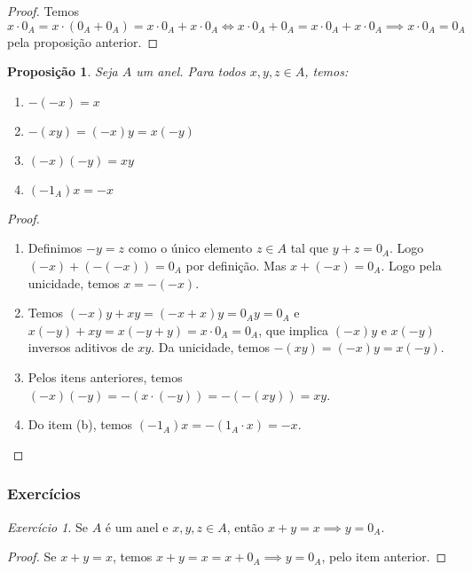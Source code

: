 \documentclass{article}
\newtheorem{prop}{Proposição}[section]
\theoremstyle{theorem}
\theoremstyle{lemma}
\theoremstyle{definition}
\theoremstyle{remark}
\newtheorem{exercicio}{Exercício}[subsection]
\begin{document}
\begin{proof}
	Temos $x\cdot 0_A = x\cdot (0_A + 0_A) = x\cdot 0_A +x\cdot 0_A \iff x\cdot 0_A + 0_A = x\cdot 0_A + x\cdot 0_A \implies x\cdot 0_A = 0_A $ pela proposição anterior.
\end{proof}
\begin{prop}
	Seja $A$  um anel. Para todos $x,y,z \in A$, temos:
	\begin{enumerate}[label=(\alph*)]
		\item $-(-x) = x$
		\item $-(xy) = (-x)y = x(-y)$
		\item $(-x)(-y) = xy$
		\item $(-1_A)x = -x$
	\end{enumerate}
\end{prop}
\begin{proof}
	~\\
	
	\begin{enumerate}[label=(\alph*)]
		\item Definimos $-y = z$ como o único elemento $z\in A$ tal que $y + z = 0_A $.   Logo $(-x) +(-(-x)) =   0_A$ por definição. Mas $x + (-x) = 0_A$. Logo pela unicidade, temos $x =-(-x)$.
		\item Temos  $(-x)y +xy = (-x+x)y = 0_A y = 0_A$ e $x(-y) +xy = x(-y+y) = x\cdot 0_A = 0_A$, que implica $(-x)y$ e $x(-y)$ inversos aditivos de $xy$. Da unicidade, temos $-(xy) = (-x)y = x(-y)$.
		\item Pelos itens anteriores, temos $(-x)(-y) = -(x\cdot (-y)) = -(-(xy)) = xy$.
		\item Do item (b), temos $(-1_A)x = -(1_A\cdot x) = -x$.
	\end{enumerate}
\end{proof}
\subsubsection{Exercícios}
\begin{exercicio}
	Se $A$ é um anel e $x,y,z\in A$, então $x+y = x \implies y = 0_A$.
\end{exercicio}
\begin{proof}
		Se $x+y = x$, temos $x+y = x = x+0_A \implies y = 0_A$, pelo item anterior.
\end{proof}
\end{document}
